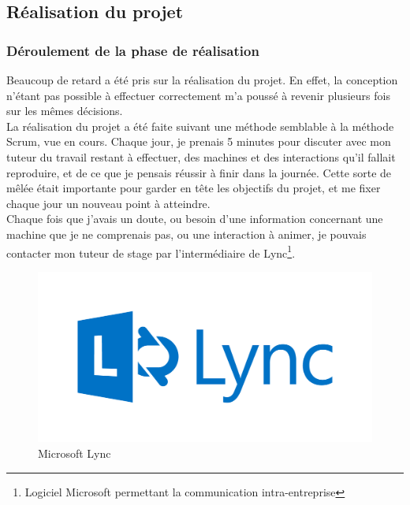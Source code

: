 \documentclass[a4paper]{article}
\begin{document}
    \newpage

    \subsection{Réalisation du projet}

    \subsubsection{Déroulement de la phase de réalisation}
    Beaucoup de retard a été pris sur la réalisation du projet. En effet, la conception n'étant pas possible à effectuer correctement m'a poussé à revenir plusieurs fois sur les mêmes décisions. \\

    La réalisation du projet a été faite suivant une méthode semblable à la méthode Scrum, vue en cours. Chaque jour, je prenais 5 minutes pour discuter avec mon tuteur du travail restant à effectuer, des machines et des interactions qu'il fallait reproduire, et de ce que je pensais réussir à finir dans la journée. Cette sorte de mêlée était importante pour garder en tête les objectifs du projet, et me fixer chaque jour un nouveau point à atteindre. \\

    Chaque fois que j'avais un doute, ou besoin d'une information concernant une machine que je ne comprenais pas, ou une interaction à animer, je pouvais contacter mon tuteur de stage par l'intermédiaire de Lync\footnote{Logiciel Microsoft permettant la communication intra-entreprise}. \\

    \begin{figure}[H]
        \centering
        \includegraphics[scale=0.5]{img/logo-lync}
        \caption{Microsoft Lync}
    \end{figure}
\end{document}
